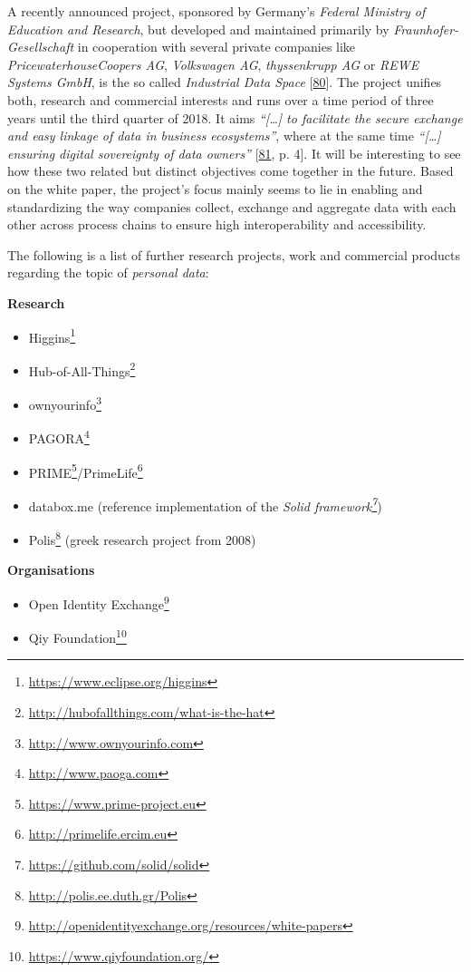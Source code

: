 \documentclass[12pt,english,a4paper,titlepage,cleardoublepage=empty,dottedtoc]{report}
\renewcommand{\href}[2]{#2\footnote{\url{#1}}}
\providecommand{\tightlist}{%
  \setlength{\itemsep}{0pt}\setlength{\parskip}{0pt}}
\begin{document}
A recently announced project, sponsored by Germany's \emph{Federal
Ministry of Education and Research}, but developed and maintained
primarily by \emph{Fraunhofer-Gesellschaft} in cooperation with several
private companies like \emph{PricewaterhouseCoopers AG},
\emph{Volkswagen AG}, \emph{thyssenkrupp AG} or \emph{REWE Systems
GmbH}, is the so called \emph{Industrial Data Space}
{[}\protect\hyperlink{ref-web_industrial-data-space}{80}{]}. The project
unifies both, research and commercial interests and runs over a time
period of three years until the third quarter of 2018. It aims
\emph{``{[}\ldots{}{]} to facilitate the secure exchange and easy
linkage of data in business ecosystems''}, where at the same time
\emph{``{[}\ldots{}{]} ensuring digital sovereignty of data owners''}
{[}\protect\hyperlink{ref-whitepaper_2016_industrial-data-space}{81}, p.
4{]}. It will be interesting to see how these two related but distinct
objectives come together in the future. Based on the white paper, the
project's focus mainly seems to lie in enabling and standardizing the
way companies collect, exchange and aggregate data with each other
across process chains to ensure high interoperability and accessibility.

The following is a list of further research projects, work and
commercial products regarding the topic of \emph{personal data}:

\textbf{Research}

\begin{itemize}
\tightlist
\item
  \href{https://www.eclipse.org/higgins}{Higgins}
\item
  \href{http://hubofallthings.com/what-is-the-hat}{Hub-of-All-Things}
\item
  \href{http://www.ownyourinfo.com}{ownyourinfo}
\item
  \href{http://www.paoga.com}{PAGORA}
\item
  \href{https://www.prime-project.eu}{PRIME}/\href{http://primelife.ercim.eu}{PrimeLife}
\item
  databox.me (reference implementation of the
  \emph{\href{https://github.com/solid/solid}{Solid framework}})
\item
  \href{http://polis.ee.duth.gr/Polis}{Polis} (greek research project
  from 2008)
\end{itemize}

\textbf{Organisations}

\begin{itemize}
\tightlist
\item
  \href{http://openidentityexchange.org/resources/white-papers}{Open
  Identity Exchange}
\item
  \href{https://www.qiyfoundation.org/}{Qiy Foundation}
\end{itemize}
\end{document}
